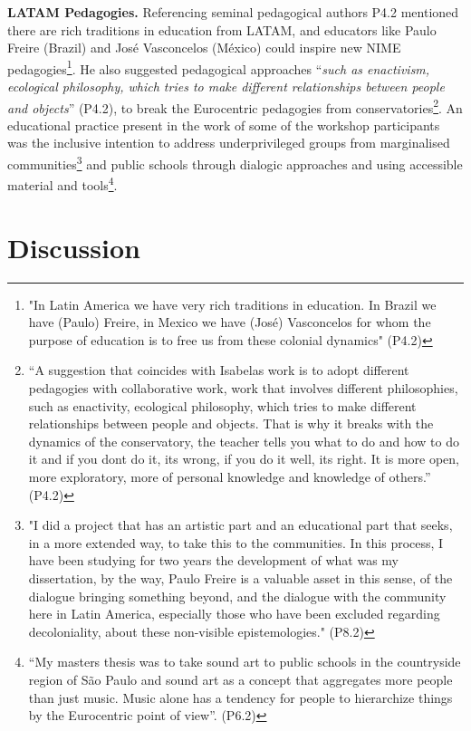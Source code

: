 \documentclass[sigconf]{nimeart}
\begin{document}
\textbf{LATAM Pedagogies.} Referencing seminal pedagogical authors P4.2 mentioned there are rich traditions in education from LATAM, and educators like Paulo Freire (Brazil) and José Vasconcelos (México) could inspire new NIME pedagogies\footnote{"In Latin America we have very rich traditions in education. In Brazil we have (Paulo) Freire, in Mexico we have (José) Vasconcelos for whom the purpose of education is to free us from these colonial dynamics" (P4.2)}. He also suggested pedagogical approaches ``\emph{such as enactivism, ecological philosophy, which tries to make different relationships between people and objects}'' (P4.2), to break the Eurocentric pedagogies from conservatories\footnote{``A suggestion that coincides with Isabela\textquotesingle s work is to adopt different pedagogies with collaborative work, work that involves different philosophies, such as enactivity, ecological philosophy, which tries to make different relationships between people and objects. That is why it breaks with the dynamics of the conservatory, the teacher tells you what to do and how to do it and if you don\textquotesingle t do it, it\textquotesingle s wrong, if you do it well, it\textquotesingle s right. It is more open, more exploratory, more of personal knowledge and knowledge of others.'' (P4.2)}. An educational practice present in the work of some of the workshop participants was the inclusive intention to address underprivileged groups from marginalised communities\footnote{"I did a project that has an artistic part and an educational part that seeks, in a more extended way, to take this to the communities. In this process, I have been studying for two years the development of what was my dissertation, by the way, Paulo Freire is a valuable asset in this sense, of the dialogue bringing something beyond, and the dialogue with the community here in Latin America, especially those who have been excluded regarding decoloniality, about these non-visible epistemologies." (P8.2)} and public schools through dialogic approaches and using accessible material and tools\footnote{``My master\textquotesingle s thesis was to take sound art to public schools in the countryside region of São Paulo and sound art as a concept that aggregates more people than just music. Music alone has a tendency for people to hierarchize things by the Eurocentric point of view''. (P6.2)}.

\section{Discussion}\label{discussion}
\end{document}
